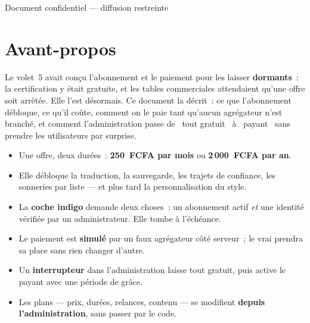 \documentclass[11pt,a4paper,oneside]{report}
\begin{document}
\begin{titlepage}
\vspace{0.8cm}
\begin{center}\color{AlanyaGray}\small\sffamily
  Document confidentiel --- diffusion restreinte
\end{center}
\end{titlepage}

\chapter*{Avant-propos}
\thispagestyle{plain}

Le volet~5 avait conçu l'abonnement et le paiement pour les laisser \textbf{dormants}~: la
certification y était gratuite, et les tables commerciales attendaient qu'une offre soit
arrêtée. Elle l'est désormais. Ce document la décrit~: ce que l'abonnement débloque, ce qu'il
coûte, comment on le paie tant qu'aucun agrégateur n'est branché, et comment l'administration
passe de \guillemotleft~tout gratuit~\guillemotright{} à \guillemotleft~payant~\guillemotright{}
sans prendre les utilisateurs par surprise.

\begin{note}
\begin{itemize}[leftmargin=1.2em, itemsep=1pt, topsep=2pt]
  \item Une offre, deux durées~: \textbf{250~FCFA par mois} ou \textbf{2\,000~FCFA par an}.
  \item Elle débloque la traduction, la sauvegarde, les trajets de confiance, les sonneries
        par liste --- et plus tard la personnalisation du style.
  \item La \textbf{coche indigo} demande deux choses~: un abonnement actif \emph{et} une
        identité vérifiée par un administrateur. Elle tombe à l'échéance.
  \item Le paiement est \textbf{simulé} par un faux agrégateur côté serveur~; le vrai
        prendra sa place sans rien changer d'autre.
  \item Un \textbf{interrupteur} dans l'administration laisse tout gratuit, puis active le
        payant avec une période de grâce.
  \item Les plans --- prix, durées, relances, contenu --- se modifient \textbf{depuis
        l'administration}, sans passer par le code.
\end{itemize}
\end{note}
\end{document}
